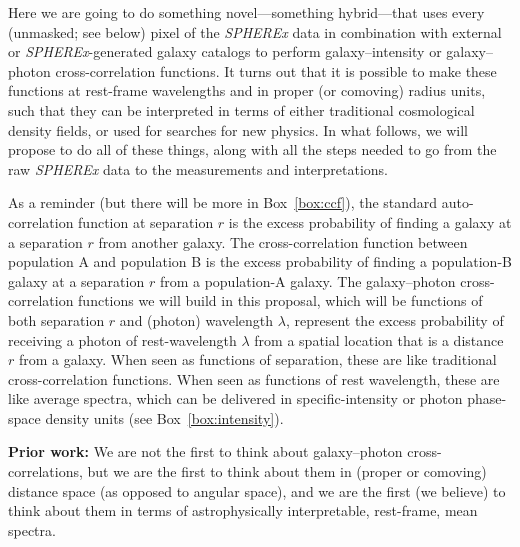 \documentclass[12pt]{article}
\newcommand{\paragraphskip}{\medskip}
\renewcommand{\paragraph}[1]{\par\paragraphskip\noindent\textbf{#1}}
\newcounter{box}
\newcommand{\boxname}{Box}
\newcommand{\boxref}[1]{\boxname~\ref{#1}}
\begin{document}
Here we are going to do something novel---something hybrid---that uses every (unmasked; see below) pixel of the \textsl{SPHEREx} data in combination with external or \textsl{SPHEREx}-generated galaxy catalogs to perform galaxy--intensity or galaxy--photon cross-correlation functions.
It turns out that it is possible to make these functions at rest-frame wavelengths and in proper (or comoving) radius units, such that they can be interpreted in terms of either traditional cosmological density fields, or used for searches for new physics.
In what follows, we will propose to do all of these things, along with all the steps needed to go from the raw \textsl{SPHEREx} data to the measurements and interpretations.

As a reminder (but there will be more in \boxref{box:ccf}), the standard auto-correlation function at separation $r$ is the excess probability of finding a galaxy at a separation $r$ from another galaxy.
The cross-correlation function between population A and population B is the excess probability of finding a population-B galaxy at a separation $r$ from a population-A galaxy.
The galaxy--photon cross-correlation functions we will build in this proposal, which will be functions of both separation $r$ and (photon) wavelength $\lambda$, represent the excess probability of receiving a photon of rest-wavelength $\lambda$ from a spatial location that is a distance $r$ from a galaxy.
When seen as functions of separation, these are like traditional cross-correlation functions.
When seen as functions of rest wavelength, these are like average spectra, which can be delivered in specific-intensity or photon phase-space density units (see \boxref{box:intensity}).

\paragraph{Prior work:}
We are not the first to think about galaxy--photon cross-correlations, but we are the first to think about them in (proper or comoving) distance space (as opposed to angular space), and we are the first (we believe) to think about them in terms of astrophysically interpretable, rest-frame, mean spectra.

\end{document}

